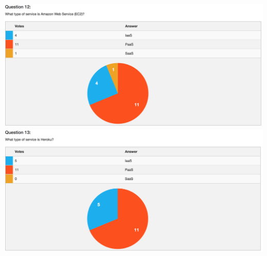 \includegraphics[width=14cm]{figures/votiee/w1q12}\\
\includegraphics[width=14cm]{figures/votiee/w1q13}\\